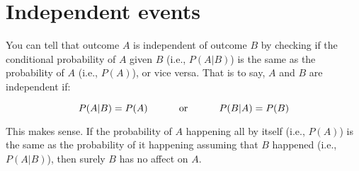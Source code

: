 \documentclass[../../../main.tex]{subfiles}
\begin{document}
\section{Independent events}

You can tell that outcome $A$ is independent of outcome $B$ by checking if the conditional probability of $A$ given $B$ (i.e., $P(A | B)$) is the same as the probability of $A$ (i.e., $P(A)$), or vice versa. That is to say, $A$ and $B$ are independent if:

\begin{equation*}
  P(A  | B) = P(A) \hskip 1cm \text{ or } \hskip 1cm P(B | A) = P(B)
\end{equation*}

\noindent
This makes sense. If the probability of $A$ happening all by itself (i.e., $P(A)$) is the same as the probability of it happening assuming that $B$ happened (i.e., $P(A | B)$), then surely $B$ has no affect on $A$.
\end{document}
